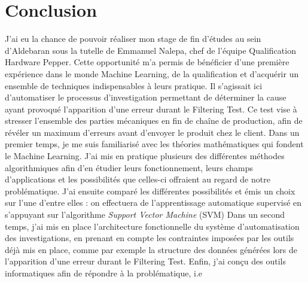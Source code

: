 \chapter{Conclusion}
\label{Conclusion}
\thispagestyle{fancy}

J'ai eu la chance de pouvoir réaliser mon stage de fin d'études au sein d'Aldebaran sous la tutelle de Emmanuel Nalepa, chef de l'équipe Qualification Hardware Pepper. Cette opportunité m'a permis de bénéficier d'une première expérience dans le monde Machine Learning, de la qualification et d'acquérir un ensemble de techniques indispensables à leurs pratique. Il s'agissait ici d'automatiser le processus d'investigation permettant de déterminer la cause ayant provoqué l'apparition d'une erreur durant le Filtering Test. Ce test vise à stresser l'ensemble des parties mécaniques en fin de chaîne de production, afin de révéler un maximum d'erreurs avant d'envoyer le produit chez le client.
\newline
Dans un premier temps, je me suis familiarisé avec les théories mathématiques qui fondent le Machine Learning. J'ai mis en pratique plusieurs des différentes méthodes algorithmiques afin d'en étudier leurs fonctionnement, leurs champs d'applications et les possibilités que celles-ci offraient au regard de notre problématique. J'ai ensuite comparé les différentes possibilités et émis un choix sur l'une d'entre elles : on effectuera de l'apprentissage automatique supervisé en s'appuyant sur l'algorithme \emph{Support Vector Machine} (SVM)
\newline
Dans un second temps, j'ai mis en place l'architecture fonctionnelle du système d'automatisation des investigations, en prenant en compte les contraintes imposées par les outils déjà mis en place, comme par exemple la structure des données générées lors de l'apparition d'une erreur durant le Filtering Test. 
\newline
Enfin, j'ai conçu des outils informatiques afin de répondre à la problématique, i.e 